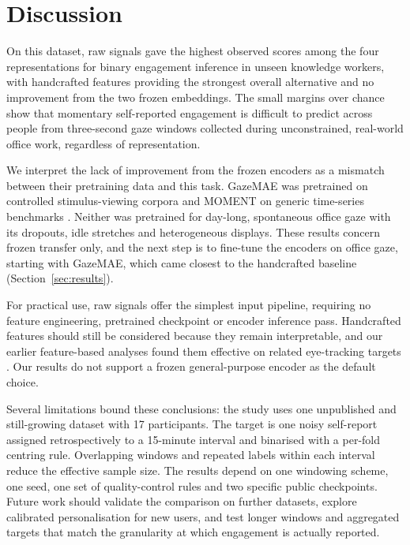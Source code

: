 \section{Discussion}

On this dataset, raw signals gave the highest observed scores among the four representations for binary engagement inference in unseen knowledge workers, with handcrafted features providing the strongest overall alternative and no improvement from the two frozen embeddings.
The small margins over chance show that momentary self-reported engagement is difficult to predict across people from three-second gaze windows collected during unconstrained, real-world office work, regardless of representation.

We interpret the lack of improvement from the frozen encoders as a mismatch between their pretraining data and this task.
GazeMAE was pretrained on controlled stimulus-viewing corpora and MOMENT on generic time-series benchmarks \cite{bautista2020gazemae,goswami2024moment}.
Neither was pretrained for day-long, spontaneous office gaze with its dropouts, idle stretches and heterogeneous displays.
These results concern frozen transfer only, and the next step is to fine-tune the encoders on office gaze, starting with GazeMAE, which came closest to the handcrafted baseline (Section~\ref{sec:results}).

For practical use, raw signals offer the simplest input pipeline, requiring no feature engineering, pretrained checkpoint or encoder inference pass.
Handcrafted features should still be considered because they remain interpretable, and our earlier feature-based analyses found them effective on related eye-tracking targets \cite{bozak2026workload,bozak2024emotion}.
Our results do not support a frozen general-purpose encoder as the default choice.

Several limitations bound these conclusions: the study uses one unpublished and still-growing dataset with 17 participants.
The target is one noisy self-report assigned retrospectively to a 15-minute interval and binarised with a per-fold centring rule.
Overlapping windows and repeated labels within each interval reduce the effective sample size.
The results depend on one windowing scheme, one seed, one set of quality-control rules and two specific public checkpoints.
Future work should validate the comparison on further datasets, explore calibrated personalisation for new users, and test longer windows and aggregated targets that match the granularity at which engagement is actually reported.

